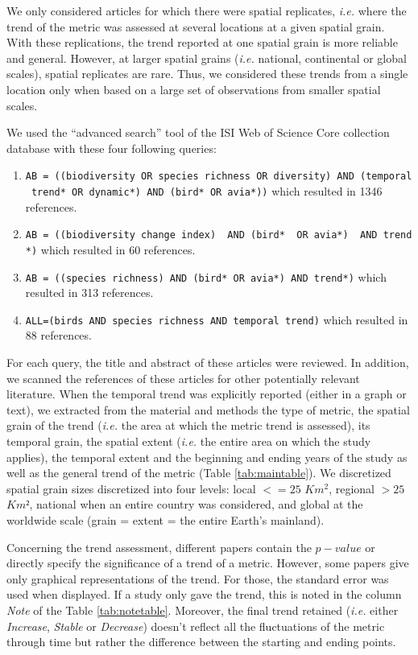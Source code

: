 \documentclass[
  12pt,
  oneside]{report}
\begin{document}
We only considered articles for which there were spatial replicates, \emph{i.e.} where the trend of the metric was assessed at several locations at a given spatial grain. With these replications, the trend reported at one spatial grain is more reliable and general. However, at larger spatial grains (\emph{i.e.} national, continental or global scales), spatial replicates are rare. Thus, we considered these trends from a single location only when based on a large set of observations from smaller spatial scales.

We used the ``advanced search'' tool of the ISI Web of Science Core collection database with these four following queries:

\begin{enumerate}
\def\labelenumi{\arabic{enumi}.}
\item
  \texttt{AB\ =\ ((biodiversity\ OR\ species\ richness\ OR\ diversity)\ AND\ (temporal\ trend*\ OR\ dynamic*)\ AND\ (bird*\ OR\ avia*))} which resulted in 1346 references.
\item
  \texttt{AB\ =\ ((biodiversity\ change\ index)\ \ AND\ (bird*\ \ OR\ avia*)\ \ AND\ trend*)} which resulted in 60 references.
\item
  \texttt{AB\ =\ ((species\ richness)\ AND\ (bird*\ OR\ avia*)\ AND\ trend*)} which resulted in 313 references.
\item
  \texttt{ALL=(birds\ AND\ species\ richness\ AND\ temporal\ trend)} which resulted in 88 references.
\end{enumerate}

For each query, the title and abstract of these articles were reviewed. In addition, we scanned the references of these articles for other potentially relevant literature. When the temporal trend was explicitly reported (either in a graph or text), we extracted from the material and methods the type of metric, the spatial grain of the trend (\emph{i.e.} the area at which the metric trend is assessed), its temporal grain, the spatial extent (\emph{i.e.} the entire area on which the study applies), the temporal extent and the beginning and ending years of the study as well as the general trend of the metric (Table \ref{tab:maintable}). We discretized spatial grain sizes discretized into four levels: local \(<=25\) \(Km^2\), regional \(>25\) \(Km²\), national when an entire country was considered, and global at the worldwide scale (grain = extent = the entire Earth's mainland).

Concerning the trend assessment, different papers contain the \(p-value\) or directly specify the significance of a trend of a metric. However, some papers give only graphical representations of the trend. For those, the standard error was used when displayed. If a study only gave the trend, this is noted in the column \emph{Note} of the Table \ref{tab:notetable}. Moreover, the final trend retained (\emph{i.e.} either \emph{Increase}, \emph{Stable} or \emph{Decrease}) doesn't reflect all the fluctuations of the metric through time but rather the difference between the starting and ending points.
\end{document}
